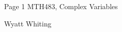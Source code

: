 \documentclass{article}
\begin{document}
\large %


{\Large Page 1 %
\hfill  MTH483, Complex Variables}

\begin{center}
{\Large Wyatt Whiting}
\end{center}
\vspace{0.05in}

\end{document}
